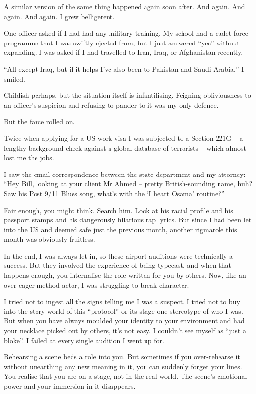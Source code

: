 \documentclass[10pt,a4paper]{article}
\begin{document}
A similar version of the same thing happened again soon after. And again. And again. And again. I grew belligerent.

One officer asked if I had had any military training. My school had a cadet-force programme that I was swiftly ejected from, but I just answered “yes” without expanding. I was asked if I had travelled to Iran, Iraq, or Afghanistan recently.

“All except Iraq, but if it helps I’ve also been to Pakistan and Saudi Arabia,” I smiled.

Childish perhaps, but the situation itself is infantilising. Feigning obliviousness to an officer’s suspicion and refusing to pander to it was my only defence.

But the farce rolled on.

Twice when applying for a US work visa I was subjected to a Section 221G – a lengthy background check against a global database of terrorists – which almost lost me the jobs.

I saw the email correspondence between the state department and my attorney: “Hey Bill, looking at your client Mr Ahmed – pretty British-sounding name, huh? Saw his Post 9/11 Blues song, what’s with the ‘I heart Osama’ routine?”

Fair enough, you might think. Search him. Look at his racial profile and his passport stamps and his dangerously hilarious rap lyrics. But since I had been let into the US and deemed safe just the previous month, another rigmarole this month was obviously fruitless.

In the end, I was always let in, so these airport auditions were technically a success. But they involved the experience of being typecast, and when that happens enough, you internalise the role written for you by others. Now, like an over-eager method actor, I was struggling to break character.

I tried not to ingest all the signs telling me I was a suspect. I tried not to buy into the story world of this “protocol” or its stage-one stereotype of who I was. But when you have always moulded your identity to your environment and had your necklace picked out by others, it’s not easy. I couldn’t see myself as “just a bloke”. I failed at every single audition I went up for.

Rehearsing a scene beds a role into you. But sometimes if you over-rehearse it without unearthing any new meaning in it, you can suddenly forget your lines. You realise that you are on a stage, not in the real world. The scene’s emotional power and your immersion in it disappears.
\end{document}
